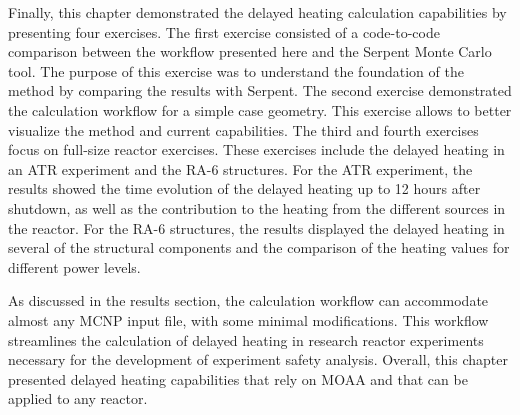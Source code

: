 Finally, this chapter demonstrated the delayed heating calculation capabilities by presenting four exercises.
The first exercise consisted of a code-to-code comparison between the workflow presented here and the Serpent Monte Carlo tool.
The purpose of this exercise was to understand the foundation of the method by comparing the results with Serpent.
The second exercise demonstrated the calculation workflow for a simple case geometry.
This exercise allows to better visualize the method and current capabilities.
The third and fourth exercises focus on full-size reactor exercises.
These exercises include the delayed heating in an ATR experiment and the RA-6 structures.
For the ATR experiment, the results showed the time evolution of the delayed heating up to 12 hours after shutdown, as well as the contribution to the heating from the different sources in the reactor.
For the RA-6 structures, the results displayed the delayed heating in several of the structural components and the comparison of the heating values for different power levels.

As discussed in the results section, the calculation workflow can accommodate almost any MCNP input file, with some minimal modifications.
This workflow streamlines the calculation of delayed heating in research reactor experiments necessary for the development of experiment safety analysis.
Overall, this chapter presented delayed heating capabilities that rely on MOAA and that can be applied to any reactor.
